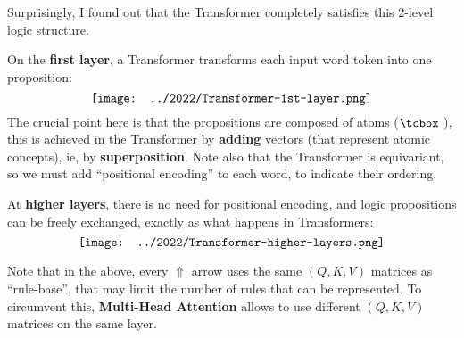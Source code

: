 \begin{preview}
\begin{minipage}{\textwidth}
Surprisingly, I found out that the Transformer completely satisfies this 2-level logic structure.

On the \textbf{first layer}, a Transformer transforms each input word token into one proposition:
\begin{equation}
\vcenter{\hbox{\texttt{[image: ../2022/Transformer-1st-layer.png]}}}
\end{equation}
The crucial point here is that the propositions are composed of atoms ($\atom$), this is achieved in the Transformer by \textbf{adding} vectors (that represent atomic concepts), ie, by \textbf{superposition}.  Note also that the Transformer is equivariant, so we must add ``positional encoding'' to each word, to indicate their ordering.

At \textbf{higher layers}, there is no need for positional encoding, and logic propositions can be freely exchanged, exactly as what happens in Transformers:
\begin{equation}
\vcenter{\hbox{\texttt{[image: ../2022/Transformer-higher-layers.png]}}}
\end{equation}

Note that in the above, every $\Uparrow$ arrow uses the same $(Q,K,V)$ matrices as ``rule-base'', that may limit the number of rules that can be represented.  To circumvent this, \textbf{Multi-Head Attention} allows to use different $(Q,K,V)$ matrices on the same layer.

\end{minipage}
\end{preview}

\begin{comment}
\begin{preview}
\begin{minipage}{\textwidth}
\setlength{\parskip}{0.4\baselineskip}

\begin{textblock*}{20cm}(2.1cm,2cm) %
	{\color{red}{\large \textcircled{\small 2}}}
	\hspace{8cm}
	\color{blue}{\footnotesize \cc{逻辑 Transformer}{Logic Transformer}}
\end{textblock*}
\vspace*{0.3cm} 

\end{minipage}
\end{preview}
\end{comment}


